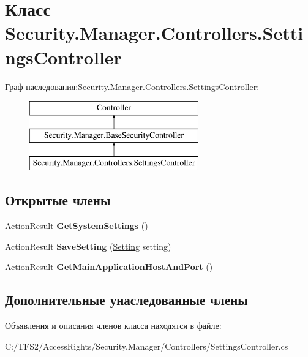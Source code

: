 \hypertarget{class_security_1_1_manager_1_1_controllers_1_1_settings_controller}{}\section{Класс Security.\+Manager.\+Controllers.\+Settings\+Controller}
\label{class_security_1_1_manager_1_1_controllers_1_1_settings_controller}
Граф наследования\+:Security.\+Manager.\+Controllers.\+Settings\+Controller\+:\begin{figure}[H]
\begin{center}
\leavevmode
\includegraphics[height=3.000000cm]{d7/d09/class_security_1_1_manager_1_1_controllers_1_1_settings_controller}
\end{center}
\end{figure}
\subsection*{Открытые члены}
\begin{DoxyCompactItemize}
\item 
\mbox{\label{class_security_1_1_manager_1_1_controllers_1_1_settings_controller_afec170f97804904d59dac4884aae7de3}} 
Action\+Result {\bfseries Get\+System\+Settings} ()
\item 
\mbox{\label{class_security_1_1_manager_1_1_controllers_1_1_settings_controller_ac3eddf438b9ae45ef3d12079305e1eb2}} 
Action\+Result {\bfseries Save\+Setting} (\hyperlink{class_security_1_1_model_1_1_setting}{Setting} setting)
\item 
\mbox{\label{class_security_1_1_manager_1_1_controllers_1_1_settings_controller_ab1d526cb92b90ebb90c62cc7215322c7}} 
Action\+Result {\bfseries Get\+Main\+Application\+Host\+And\+Port} ()
\end{DoxyCompactItemize}
\subsection*{Дополнительные унаследованные члены}


Объявления и описания членов класса находятся в файле\+:\begin{DoxyCompactItemize}
\item 
C\+:/\+T\+F\+S2/\+Access\+Rights/\+Security.\+Manager/\+Controllers/Settings\+Controller.\+cs\end{DoxyCompactItemize}
